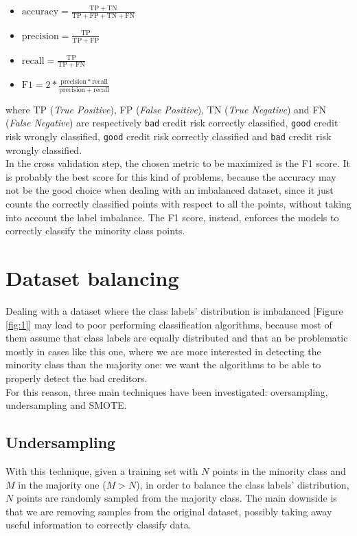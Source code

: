 \documentclass[letterpaper]{article}
\begin{document}
	\begin{itemize}
		\item $\mathrm{accuracy} = \frac{\mathrm{TP}+\mathrm{TN}}{\mathrm{TP}+\mathrm{FP}+\mathrm{TN}+\mathrm{FN}}$
		\item $\mathrm{precision} = \frac{\mathrm{TP}}{\mathrm{TP}+\mathrm{FP}}$ 
		\item $\mathrm{recall} =  \frac{\mathrm{TP}}{\mathrm{TP}+\mathrm{FN}}$
		\item $\mathrm{F1} = 2 * \frac{\mathrm{precision}*\mathrm{recall}}{\mathrm{precis	ion}+\mathrm{recall}}$
	\end{itemize}
	where TP (\emph{True Positive}), FP (\emph{False Positive}), TN (\emph{True Negative}) and FN (\emph{False Negative}) are respectively \texttt{bad} credit risk correctly classified, \texttt{good} credit risk wrongly classified, \texttt{good} credit risk correctly classified and \texttt{bad} credit risk wrongly classified. \\
	In the cross validation step, the chosen metric to be maximized is the F1 score.
	It is probably the best score for this kind of problems, because the accuracy may not be the good choice when dealing with an imbalanced dataset, since it just counts the correctly classified points with respect to all the points, without taking into account the label imbalance. The F1 score, instead, enforces the models to correctly classify the minority class points.

	\section{Dataset balancing} \label{dataset_balancing}
	Dealing with a dataset where the class labels' distribution is imbalanced [Figure \ref{fig:1}] may lead to poor performing classification algorithms, because most of them assume that class labels are equally distributed and that an be problematic mostly in cases like this one, where we are more interested in detecting the minority class than the majority one: we want the algorithms to be able to properly detect the bad creditors.\\
	For this reason, three main techniques have been investigated: oversampling, undersampling and SMOTE.
	\subsection{Undersampling}
	With this technique, given a training set with $N$ points in the minority class and $M$ in the majority one ($M > N$), in order to balance the class labels' distribution, $N$ points are randomly sampled from the majority class. The main downside is that we are removing samples from the original dataset, possibly taking away useful information to correctly classify data.
\end{document}
